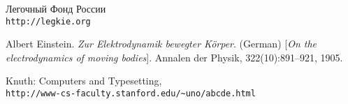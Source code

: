 \begin{thebibliography}{9}
Легочный Фонд России
\\\texttt{http://legkie.org}
 
Albert Einstein. 
\textit{Zur Elektrodynamik bewegter K{\"o}rper}. (German) 
[\textit{On the electrodynamics of moving bodies}]. 
Annalen der Physik, 322(10):891–921, 1905.
 
Knuth: Computers and Typesetting,
\\\texttt{http://www-cs-faculty.stanford.edu/\~{}uno/abcde.html}
\end{thebibliography}



